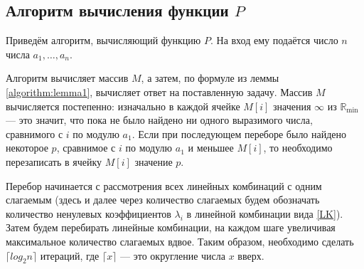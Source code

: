 \documentclass[12pt]{article}
\begin{document}
\subsection*{Алгоритм вычисления функции $P$}

Приведём алгоритм, вычисляющий функцию $P$. На вход ему подаётся  число $n$ числа $a_1, \dots, a_n$.

Алгоритм вычисляет массив $M$, а затем, по формуле из леммы \ref{algorithm:lemma1}, вычисляет ответ на поставленную задачу. Массив $M$ вычисляется постепенно: изначально в каждой ячейке $M[i]$ значения $\infty$ из $\mathbb{R}_{\min}$ --- это значит, что пока не было найдено ни одного выразимого числа, сравнимого с $i$ по модулю $a_1$. Если при последующем переборе было найдено некоторое $p$, сравнимое с $i$ по модулю $a_1$ и меньшее $M[i]$, то необходимо перезаписать в ячейку $M[i]$ значение $p$.

Перебор начинается с рассмотрения всех линейных комбинаций с одним слагаемым (здесь и далее через количество слагаемых будем обозначать количество ненулевых коэффициентов $\lambda_i$ в линейной комбинации вида \ref{LK}). Затем будем перебирать линейные комбинации, на каждом шаге увеличивая максимальное количество слагаемых вдвое. Таким образом, необходимо сделать $\lceil log_2n \rceil$ итераций, где $\lceil x \rceil$ --- это округление числа $x$ вверх.
\end{document}
